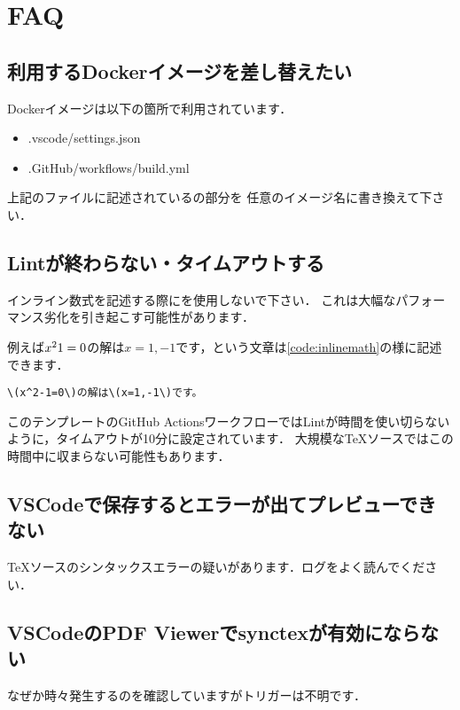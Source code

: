 \documentclass[main]{subfiles}
\begin{document}
\section{FAQ}

\subsection{利用するDockerイメージを差し替えたい}

Dockerイメージは以下の箇所で利用されています．

\begin{itemize}
    \item .vscode/settings.json
    \item .GitHub/workflows/build.yml
\end{itemize}

上記のファイルに記述されているの部分を
任意のイメージ名に書き換えて下さい．

\subsection{Lintが終わらない・タイムアウトする}

インライン数式を記述する際に\code{\$}を使用しないで下さい．
これは大幅なパフォーマンス劣化を引き起こす可能性があります．


例えば\(x^2\-1=0\)の解は\(x=1,-1\)です，という文章は\lstlistingname\ref{code:inlinemath}の様に記述できます．

\begin{lstlisting}[caption={インライン数式の記述例},label={code:inlinemath}]
    \(x^2-1=0\)の解は\(x=1,-1\)です。
\end{lstlisting}

このテンプレートのGitHub ActionsワークフローではLintが時間を使い切らないように，タイムアウトが10分に設定されています．
大規模なTeXソースではこの時間中に収まらない可能性もあります．

\subsection{VSCodeで保存するとエラーが出てプレビューできない}

TeXソースのシンタックスエラーの疑いがあります．ログをよく読んでください．

\subsection{VSCodeのPDF Viewerでsynctexが有効にならない}

なぜか時々発生するのを確認していますがトリガーは不明です．
\end{document}
